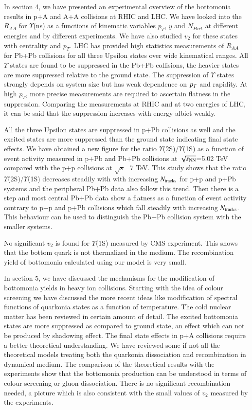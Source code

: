 In section 4, we have presented an experimental overview of the bottomonia
results in p+A and A+A collisions at RHIC and LHC. We have looked into the
$R_{AA}$ for $\Upsilon$(ns) as a functions of kinematic variables 
$p_T$, $y$ and $N_{Part}$ at different energies and by different experiments. 
We have also studied $v_2$ for these states with centrality and $p_T$.
LHC has provided high statistics measurements of $R_{AA}$ for
Pb+Pb collisions for all three Upsilon states over wide kinematical ranges.
All $\Upsilon$ states are found to be suppressed in the Pb+Pb collisions,
the heavier states are more suppressed relative to the ground state.
The suppression of $\Upsilon$ states strongly depends on system size but
has weak dependence on $p_{T}$ and rapidity. At high $p_T$, more precise
measurements are required to ascertain flatness in the suppression. 
Comparing the measurements at RHIC and at two energies of LHC, it can be
said that the suppression increases with energy albiet weakly.

All the three Upsilon states are suppressed in p+Pb collisions as well
and the excited states are more suppressed than the ground state indicating
final state effects.
We have obtained a new figure for the ratio $\Upsilon$(2S)/$\Upsilon$(1S)
as a function of event activity measured in p+Pb and Pb+Pb collisions at
$\sqrt{s_{\rm NN}}$=5.02 TeV compared with the 
p+p collisions at $\sqrt{s}$=7 TeV. This study shows 
that the ratio $\Upsilon$(2S)/$\Upsilon$(1S) decreases steadily
with with increasing $N_{\rm tracks}$ for
p+p and p+Pb systems and the peripheral Pb+Pb data also follow this trend.
Then there is a step and most central Pb+Pb
data show a flatness as a function of event activity contrary to p+p and
p+Pb collisions which fall steadily with increasing $N_{\rm tracks}$.
This behaviour can be used to distinguish the Pb+Pb collision
system with the smaller systems.
 
No significant $v_2$ is found for $\Upsilon$(1S) measured by CMS
experiment. This shows that the bottom quark is not thermalized in the medium.
The recombination yield of bottomonia calculated using our model
is very small. 


In section 5, we have discussed the mechanisms for the modification of 
bottomonia yields in heavy ion collisions.
Starting with the idea of colour screening we have discussed the more recent
ideas like modification of spectral functions of quarkonia states as
a function of temperature.
The cold nuclear matter has been reviewed in certain amount of detail.
The excited bottomonia states are more suppressed as compared to ground state,
an effect which can not be produced by shadowing effect. The final state
effects in p+A collisions require a better theoretical understanding. 
We have reviewed some if not all the theoretical models treating both
the quarkonia dissociation and recombination in dynamical medium.
The comparison of the theoretical results with the experiments show that
the bottomonia production can be understood in terms of colour screening
or gluon dissociation. There is no significant recombination needed,
a picture which is also consistent with the small values of $v_2$ measured
by the experiments.

 

